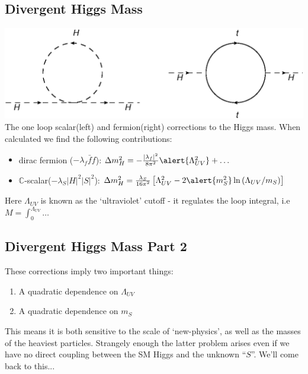 \documentclass{beamer}
\begin{document}
\subsection{Divergent Higgs Mass}
\begin{frame}{\insertsubsection}
  \center\includegraphics[scale=0.4]{oneloop.eps}\\
  The one loop scalar(left) and fermion(right) corrections to the Higgs mass.
  When calculated we find the following contributions:
  \begin{itemize}
    \item dirac fermion ($-\lambda_{f}\bar{f}f$):
    $\Delta m_{H}^{2}=-\frac{|\lambda_{f}|^2}{8\pi^{2}}\alert{\Lambda_{UV}^{2}}
    +\hdots$ 
    \item $\mathbb{C}$-scalar($-\lambda_{S}|H|^{2}|S|^{2}$): 
    $\Delta m_{H}^{2}= \frac{\lambda_{S}}{16\pi^{2}}\left[\Lambda_{UV}^{2}-2
    \alert{m_{S}^{2}}\ln\left(\Lambda_{UV}/m_{S}\right) \right]$
  \end{itemize}
  Here $\Lambda_{UV}$ is known as the `ultraviolet' cutoff - it regulates the loop
  integral, i.e $M=\int_{0}^{\Lambda_{UV}}\hdots$
\end{frame}

\subsection{Divergent Higgs Mass Part 2}
\begin{frame}{\insertsubsection}
  These corrections imply two important things:
  \begin{enumerate}
    \item A quadratic dependence on $\Lambda_{UV}$
    \item A quadratic dependence on $m_{S}$
  \end{enumerate}
  This means it is both sensitive to the scale of `new-physics', as well as the
  masses of the heaviest particles.  Strangely enough the latter problem arises
  even if we have no direct coupling between the SM Higgs and the unknown
  ``$S$''.
  \vfill\hfill We'll come back to this...
\end{frame}
\end{document}

